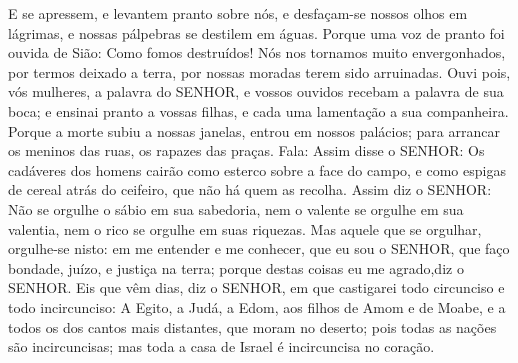 {E se apressem, e levantem pranto sobre nós, e desfaçam-se nossos olhos em lágrimas, e nossas pálpebras se destilem em águas.
Porque uma voz de pranto foi ouvida de Sião: Como fomos destruídos! Nós nos tornamos muito envergonhados, por termos deixado a terra, por nossas moradas terem sido arruinadas.
Ouvi pois, vós mulheres, a palavra do SENHOR, e vossos ouvidos recebam a palavra de sua boca; e ensinai pranto a vossas filhas, e cada uma lamentação a sua companheira.
Porque a morte subiu a nossas janelas,
{} entrou em nossos palácios; para arrancar os meninos das ruas, os rapazes das praças.
Fala: Assim disse o SENHOR: Os cadáveres dos homens cairão como esterco sobre a face do campo, e como espigas de cereal atrás do ceifeiro, que não há quem as recolha.
Assim diz o SENHOR: Não se orgulhe o sábio em sua sabedoria, nem o valente se orgulhe em sua valentia, nem o rico se orgulhe em suas riquezas.
Mas aquele que se orgulhar, orgulhe-se nisto: em me entender e me conhecer, que eu sou o SENHOR, que faço bondade, juízo, e justiça na terra; porque destas coisas eu me agrado,diz o SENHOR.
Eis que vêm dias, diz o SENHOR, em que castigarei todo circunciso e todo incircunciso:
A Egito, a Judá, a Edom, aos filhos de Amom e de Moabe, e a todos os dos cantos mais distantes,
 que moram no deserto; pois todas as nações são incircuncisas; mas toda a casa de Israel é incircuncisa no coração.

\par }


